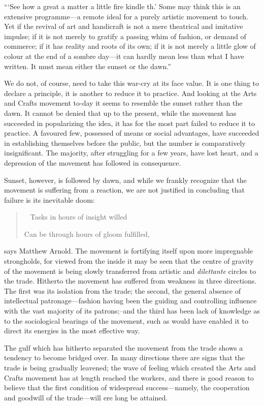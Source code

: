 \documentclass{book}
\newenvironment{mdblockquote}{%
  \begin{quotation}
    \
}{%
  \end{quotation}
}
\begin{document}
“‘See how a great a matter a little fire kindle th.’ Some may think this is an extensive programme—a remote ideal for a purely artistic movement to touch. Yet if the revival of art and handicraft is not a mere theatrical and imitative impulse; if it is not merely to gratify a passing whim of fashion, or demand of commerce; if it has reality and roots of its own; if it is not merely a little glow of colour at the end of a sombre day—it can hardly mean less than what I have written. It must mean either the sunset or the dawn.”

We do not, of course, need to take this war-cry at its face value. It is one thing to declare a principle, it is another to reduce it to practice. And looking at the Arts and Crafts movement to-day it seems to resemble the sunset rather than the dawn. It cannot be denied that up to the present, while the movement has succeeded in popularizing the idea, it has for the most part failed to reduce it to practice. A favoured few, possessed of means or social advantages, have succeeded in establishing themselves before the public, but the number is comparatively insignificant. The majority, after struggling for a few years, have lost heart, and a depression of the movement has followed in consequence.

Sunset, however, is followed by dawn, and while we frankly recognize that the movement is suffering from a reaction, we are not justified in concluding that failure is its inevitable doom:

\begin{mdblockquote}
	Tasks in hours of insight willed

	Can be through hours of gloom fulfilled,


\end{mdblockquote}
says Matthew Arnold. The movement is fortifying itself upon more impregnable strongholds, for viewed from the inside it may be seen that the centre of gravity of the movement is being slowly transferred from artistic and \emph{dilettante} circles to the trade. Hitherto the movement has suffered from weakness in three directions. The first was its isolation from the trade; the second, the general absence of intellectual patronage—fashion having been the guiding and controlling influence with the vast majority of its patrons;–and the third has been lack of knowledge as to the sociological bearings of the movement, such as would have enabled it to direct its energies in the most effective way.

The gulf which has hitherto separated the movement from the trade shows a tendency to become bridged over. In many directions there are signs that the trade is being gradually leavened; the wave of feeling which created the Arts and Crafts movement has at length reached the workers, and there is good reason to believe that the first condition of widespread success—namely, the cooperation and goodwill of the trade—will ere long be attained.\footnotemark[3]
\end{document}
